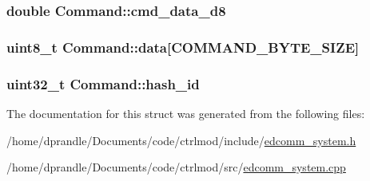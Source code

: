\hypertarget{structCommand_a629ffade344144a38ce2969fd3cdfbd8}{
\subsubsection[{cmd\-\_\-data\-\_\-d8}]{\setlength{\rightskip}{0pt plus 5cm}double Command\-::cmd\-\_\-data\-\_\-d8}}\label{structCommand_a629ffade344144a38ce2969fd3cdfbd8}
\hypertarget{structCommand_a7d7fc3de69ea51affeb1b21b891f6a8e}{
\subsubsection[{data}]{\setlength{\rightskip}{0pt plus 5cm}uint8\-\_\-t Command\-::data\mbox{[}{\bf C\-O\-M\-M\-A\-N\-D\-\_\-\-B\-Y\-T\-E\-\_\-\-S\-I\-Z\-E}\mbox{]}}}\label{structCommand_a7d7fc3de69ea51affeb1b21b891f6a8e}
\hypertarget{structCommand_abf84080387ae990df8fbae6c9e2ccc2a}{
\subsubsection[{hash\-\_\-id}]{\setlength{\rightskip}{0pt plus 5cm}uint32\-\_\-t Command\-::hash\-\_\-id}}\label{structCommand_abf84080387ae990df8fbae6c9e2ccc2a}


The documentation for this struct was generated from the following files\-:\begin{DoxyCompactItemize}
\item 
/home/dprandle/\-Documents/code/ctrlmod/include/\hyperlink{edcomm__system_8h}{edcomm\-\_\-system.\-h}\item 
/home/dprandle/\-Documents/code/ctrlmod/src/\hyperlink{edcomm__system_8cpp}{edcomm\-\_\-system.\-cpp}\end{DoxyCompactItemize}
